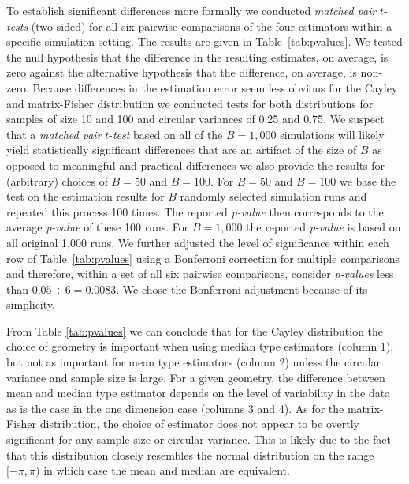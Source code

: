 \documentclass[12pt]{article}
\begin{document}
To establish significant differences more formally we conducted \textit{matched pair} $t$-\textit{tests} (two-sided) for all six pairwise comparisons of the four estimators within a specific simulation setting.  The results are given in Table~\ref{tab:pvalues}. We tested the null hypothesis that the difference in the resulting estimates, on average, is zero against the alternative hypothesis that the difference, on average, is non-zero.  Because differences in the estimation error seem less obvious for the Cayley and matrix-Fisher distribution we conducted tests for both distributions for samples of size 10 and 100 and circular variances of 0.25 and 0.75. 
We suspect that a \textit{matched pair} $t$-\textit{test} based on all of the $B=1,000$ simulations will likely yield statistically significant differences that are an artifact of the size of $B$ as opposed to meaningful and practical differences we also provide the results for (arbitrary) choices of $B=50$ and $B=100.$ For $B=50$ and $B=100$ we base the test on the estimation results for $B$ randomly selected simulation runs and repeated this process 100 times. The reported \textit{p-value} then corresponds to the average \textit{p-value} of these 100 runs. For $B=1,000$ the reported \textit{p-value} is based on all original 1,000 runs. 
We further adjusted the level of significance within each row of Table~\ref{tab:pvalues} using 
a Bonferroni correction for multiple comparisons and therefore, within a set of all six pairwise comparisons, consider \textit{p-values} less than $0.05\div6=0.0083$.  We chose the Bonferroni adjustment because of its simplicity.

From Table \ref{tab:pvalues} we can conclude that for the Cayley distribution the choice of geometry is important when using median type estimators (column 1), but not as important for mean type estimators (column 2) unless the circular variance and sample size is large.  For a given geometry, the difference between mean and median type estimator depends on the level of variability in the data as is the case in the one dimension case (columns 3 and 4).  As for the matrix-Fisher distribution, the choice of estimator does not appear to be overtly significant for any sample size or circular variance.  This is likely due to the fact that this distribution closely resembles the normal distribution on the range $[-\pi,\pi)$ in which case the mean and median are equivalent.
\end{document}
